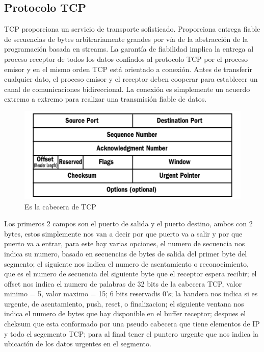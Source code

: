 	\subsection{Protocolo TCP}
		TCP proporciona un servicio de transporte sofisticado. Proporciona entrega fiable de secuencias de bytes arbitrariamente grandes por v\'ia de la abstracci\'on de la programaci\'on basada en streams. La garant\'ia de fiabilidad implica la entrega al proceso receptor de todos los datos confiados al protocolo TCP por el proceso emisor y en el mismo orden TCP est\'a orientado a conexi\'on. Antes de transferir cualquier dato, el proceso emisor y el receptor deben cooperar para establecer un canal de comunicaciones bidireccional. La conexi\'on es simplemente un acuerdo extremo a extremo para realizar una transmisi\'on fiable de datos. 
	\begin{figure}[h]
			\centering		
			\includegraphics[width=\textwidth]{CabeceraTCP}
			\caption{Es la cabecera de TCP}
	\end{figure}
\vskip 1pt
	Los primeros 2 campos son el puerto de salida y el puerto destino, ambos con 2 bytes, estos simplemente nos van a decir por que puerto va a salir y por que puerto va a entrar, para este hay varias opciones, el numero de secuencia nos indica su numero, basado en secuencias de bytes de salida del primer byte del segmento; el siguiente nos indica el numero de asentamiento o reconocimiento, que es el numero de secuencia del siguiente byte que el receptor espera recibir; el offset nos indica el numero de palabras de 32 bits de la cabecera TCP, valor minimo = 5, valor maximo = 15; 6 bits reservadis 0's; la bandera nos indica si es urgente, de asentamiento, push, reset, o finalizacion; el siguiente ventana nos indica el numero de bytes que hay disponible en el buffer receptor; despues el cheksum que esta conformado por una pseudo cabecera que tiene elementos de IP y todo el segemento TCP; para al final tener el puntero urgente que nos indica la ubicaci\'on de los datos urgentes en el segmento.
